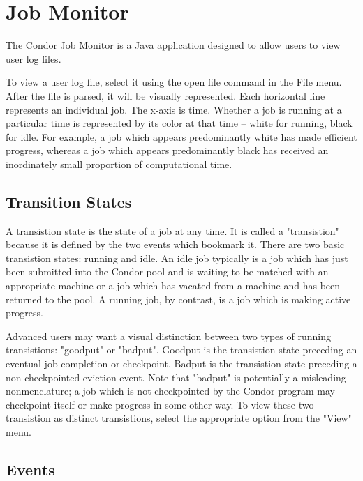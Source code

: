 
\section{Job Monitor}

The Condor Job Monitor is a Java application designed to allow users to view user log files. 

To view a user log file, select it using the open file command in the File menu.  After the file is parsed, it will be visually represented.  Each horizontal line represents an individual job.  The x-axis
is time.  Whether a job is running at a particular time is represented by its color at that time -- white for running, black for idle.  For example, a job which appears predominantly white has made
efficient progress, whereas a job which appears predominantly black has received an inordinately small proportion of computational time. 


\subsection{\label{sec:transition-states}Transition States}

A transistion state is the state of a job at any time.  It is called a "transistion" because it is defined by the two events which bookmark it.  There are two basic transistion states: running and idle. 
An idle job typically is a job which has just been submitted into the Condor pool and is waiting to be matched with an appropriate machine or a job which has vacated from a machine and has been
returned to the pool.  A running job, by contrast, is a job which is making active progress. 

Advanced users may want a visual distinction between two types of running transistions: "goodput" or "badput".  Goodput is the transistion state preceding an eventual job completion or
checkpoint.  Badput is the transistion state preceding a non-checkpointed eviction event.  Note that "badput" is potentially a misleading nonmenclature; a job which is not checkpointed by the
Condor program may checkpoint itself or make progress in some other way.  To view these two transistion as distinct transistions, select the appropriate option from the "View" menu. 


\subsection{\label{sec:events}Events}

